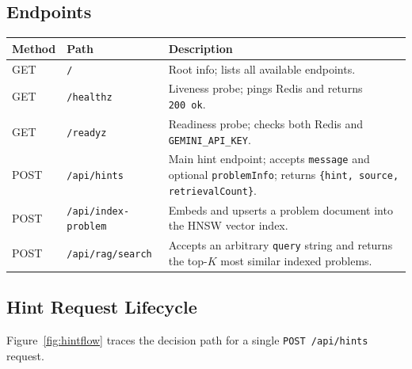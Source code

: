 \documentclass[11pt,a4paper]{article}
\begin{document}
\subsection{Endpoints}

\begin{center}
\begin{tabularx}{\linewidth}{llX}
  \toprule
  \textbf{Method} & \textbf{Path} & \textbf{Description} \\
  \midrule
  GET  & \texttt{/}                   & Root info; lists all available endpoints. \\
  GET  & \texttt{/healthz}            & Liveness probe; pings Redis and returns
                                        \texttt{200~ok}. \\
  GET  & \texttt{/readyz}             & Readiness probe; checks both Redis and
                                        \texttt{GEMINI\_API\_KEY}. \\
  POST & \texttt{/api/hints}          & Main hint endpoint; accepts
                                        \texttt{message} and optional
                                        \texttt{problemInfo}; returns
                                        \texttt{\{hint, source, retrievalCount\}}. \\
  POST & \texttt{/api/index-problem}  & Embeds and upserts a problem document
                                        into the HNSW vector index. \\
  POST & \texttt{/api/rag/search}     & Accepts an arbitrary \texttt{query}
                                        string and returns the top-$K$ most
                                        similar indexed problems. \\
  \bottomrule
\end{tabularx}
\end{center}

\subsection{Hint Request Lifecycle}

Figure~\ref{fig:hintflow} traces the decision path for a single \texttt{POST
/api/hints} request.
\end{document}
